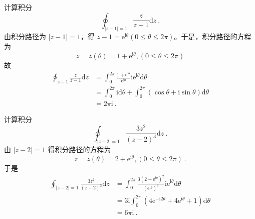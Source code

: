 \begin{example}{}
计算积分
\begin{equation}
\oint_{|z-1|=1} \frac{z}{z-1} \mathrm{d} z~.
\end{equation}
由积分路径为 $|z -1|=1$，得 $z-1=\mathrm{e}^{\mathrm{i} \theta}(0 \leqslant \theta \leqslant 2 \pi)$。于是，积分路径的方程为
\begin{equation}
z=z(\theta)=1+\mathrm{e}^{\mathrm{i} \theta},(0 \leqslant \theta \leqslant 2 \pi)
\end{equation}
故
\begin{equation}
\begin{aligned} \oint_{z-1} \frac{z}{z-1} \mathrm{d} z &=\int_{0}^{2 \pi} \frac{1+\mathrm{e}^{\mathrm{i} \theta}}{\mathrm{e}^{\mathrm{i} \theta}} \mathrm{ie}^{\mathrm{i} \theta} \mathrm{d} \theta \\ &=\int_{0}^{2 \pi} \mathrm{id} \theta+\int_{0}^{2 \pi}(\cos \theta+\mathrm{i} \sin \theta) \mathrm{d} \theta \\ &=2 \pi \mathrm{i} ~.\end{aligned}
\end{equation}
\end{example}

\begin{example}{}
计算积分
\begin{equation}
\oint_{|z-2|=1} \frac{3 z^{2}}{(z-2)^{3}} \mathrm{d} z~.
\end{equation}
由 $ |z - 2| =1$ 得积分路径的方程为
\begin{equation}
z=z(\theta)=2+\mathrm{e}^{\mathrm{i} \theta},(0 \leqslant \theta \leqslant 2 \pi)~.
\end{equation}
于是
\begin{equation}
\begin{aligned} \oint_{|z-2|=1} \frac{3 z^{2}}{(z-2)^{3}} \mathrm{d} z &=\int_{0}^{2 \pi} \frac{3\left(2+\mathrm{e}^{\mathrm{i} \theta}\right)^{2}}{\left(\mathrm{e}^{\mathrm{i} \theta}\right)^{3}} \mathrm{ie}^{\mathrm{i} \theta} \mathrm{d} \theta \\ &=3 \mathrm{i} \int_{0}^{2 \pi}\left(4 \mathrm{e}^{-\mathrm{i} 2 \theta}+4 \mathrm{e}^{\mathrm{i} \theta}+1\right) \mathrm{d} \theta \\ &=6 \pi \mathrm{i}~. \end{aligned}
\end{equation}
\end{example}